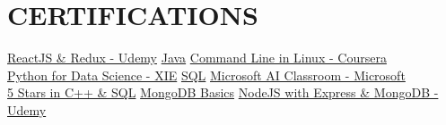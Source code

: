 \documentclass[letterpaper,11pt]{article}
\newcommand{\sbullet}{\raisebox{0.6ex}{\tiny$\bullet$}\hspace{0.5em}}
\begin{document}
\section{CERTIFICATIONS}
\sbullet \href{https://certificate.com}{ReactJS \& Redux - Udemy} \hspace{1.5cm}
\sbullet \href{https://certificate.com}{Java} \hspace{2cm}
\sbullet \href{https://certificate.com}{Command Line in Linux - Coursera} \\

\sbullet \href{https://certificate.com}{Python for Data Science - XIE} \hspace{1.2cm}
\sbullet \href{https://certificate.com}{SQL} \hspace{2.6cm}
\sbullet \href{https://certificate.com}{Microsoft AI Classroom - Microsoft} \\

\sbullet \href{https://certificate.com}{5 Stars in C++ \& SQL} \hspace{1.6cm}
\sbullet \href{https://certificate.com}{MongoDB Basics} \hspace{1.1cm}
\sbullet \href{https://certificate.com}{NodeJS with Express \& MongoDB - Udemy}
\end{document}
